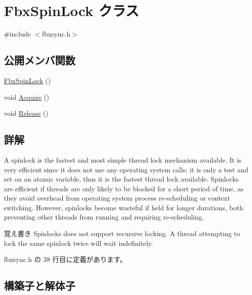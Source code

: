 \hypertarget{class_fbx_spin_lock}{}\section{Fbx\+Spin\+Lock クラス}
\label{class_fbx_spin_lock}


{\ttfamily \#include $<$fbxsync.\+h$>$}

\subsection*{公開メンバ関数}
\begin{DoxyCompactItemize}
\item 
\hyperlink{class_fbx_spin_lock_acc9c64f44e1834c2af5ab56a5a06266e}{Fbx\+Spin\+Lock} ()
\item 
void \hyperlink{class_fbx_spin_lock_a6f5aa93e51e6bd4717337bfb2216c371}{Acquire} ()
\item 
void \hyperlink{class_fbx_spin_lock_a3cc819cf0168dfc482696650b32c07f6}{Release} ()
\end{DoxyCompactItemize}


\subsection{詳解}
A spinlock is the fastest and most simple thread lock mechanism available. It is very efficient since it does not use any operating system calls; it is only a test and set on an atomic variable, thus it is the fastest thread lock available. Spinlocks are efficient if threads are only likely to be blocked for a short period of time, as they avoid overhead from operating system process re-\/scheduling or context switching. However, spinlocks become wasteful if held for longer durations, both preventing other threads from running and requiring re-\/scheduling. \begin{DoxyNote}{覚え書き}
Spinlocks does not support recursive locking. A thread attempting to lock the same spinlock twice will wait indefinitely. 
\end{DoxyNote}


 fbxsync.\+h の 38 行目に定義があります。



\subsection{構築子と解体子}
\mbox{\label{class_fbx_spin_lock_acc9c64f44e1834c2af5ab56a5a06266e}} 
